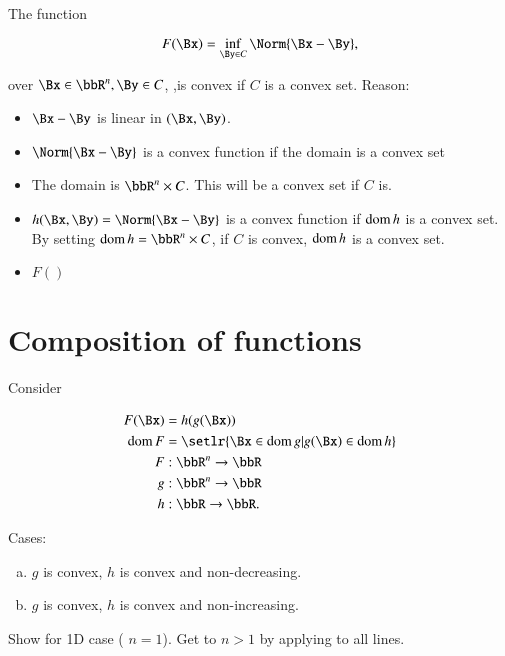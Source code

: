 The function

\begin{dmath}\label{eqn:convexOptimizationLecture8:140}
F(\Bx) = \inf_{\By \in C} \Norm{ \Bx - \By },
\end{dmath}

over \( \Bx \in \bbR^n, \By \in C \), ,is convex if \( C \) is a convex set.  Reason:

\begin{itemize}
\item \( \Bx - \By \) is linear in \((\Bx, \By)\).
\item \( \Norm{ \Bx - \By } \) is a convex function if the domain is a convex set
\item The domain is \( \bbR^n \times C \).  This will be a convex set if \( C \) is.
\item \( h(\Bx, \By) = \Norm{\Bx -\By} \) is a convex function if \( \operatorname{dom} h \) is a convex set.  By setting \( \dom h = \bbR^n \times C \), if \( C \) is convex, \( \operatorname{dom} h \) is a convex set.
\item \( F() \)
\end{itemize}

\section{Composition of functions}

Consider

\begin{dmath}\label{eqn:convexOptimizationLecture8:160}
\begin{aligned}
F(\Bx) &= h(g(\Bx)) \\
\dom F &= \setlr{ \Bx \in \dom g | g(\Bx) \in \dom h } \\
F &: \bbR^n \rightarrow \bbR \\
g &: \bbR^n \rightarrow \bbR \\
h &: \bbR \rightarrow \bbR.
\end{aligned}
\end{dmath}

Cases:
\begin{enumerate}[(a)]
\item \( g \) is convex, \( h \) is convex and non-decreasing.
\item \( g \) is convex, \( h \) is convex and non-increasing.
\end{enumerate}

Show for 1D case ( \( n = 1 \)).  Get to \( n > 1 \) by applying to all lines.


